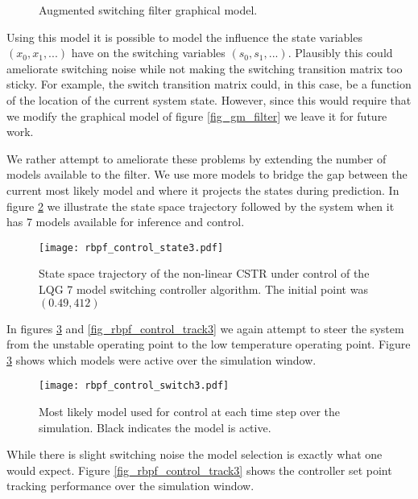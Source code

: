 \begin{enumerate}
\begin{figure}[H]
\caption{Augmented switching filter graphical model.}
\label{fig_gm_augmented}
\end{figure}
Using this model it is possible to model the influence the state variables $(x_0,x_1,...)$ have on the switching variables $(s_0, s_1,...)$. Plausibly this could ameliorate switching noise while not making the switching transition matrix too sticky. For example, the switch transition matrix could, in this case, be a function of the location of the current system state. However, since this would require that we modify the graphical model of figure \ref{fig_gm_filter} we leave it for future work.
\end{enumerate}
We rather attempt to ameliorate these problems by extending the number of models available to the filter. We use more models to bridge the gap between the current most likely model and where it projects the states during prediction. In figure \ref{fig_rbpf_control_state3} we illustrate the state space trajectory followed by the system when it has 7 models available for inference and control.
\begin{figure}[H] 
\centering
\texttt{[image: rbpf\_control\_state3.pdf]}
\caption{State space trajectory of the non-linear CSTR under control of the LQG 7 model switching controller algorithm. The initial point was $(0.49, 412)$}
\label{fig_rbpf_control_state3}
\end{figure}
In figures \ref{fig_rbpf_control_switch3} and \ref{fig_rbpf_control_track3} we again attempt to steer the system from the unstable operating point to the low temperature operating point. Figure \ref{fig_rbpf_control_switch3} shows which models were active over the simulation window.
\begin{figure}[H] 
\centering
\texttt{[image: rbpf\_control\_switch3.pdf]}
\caption{Most likely model used for control at each time step over the simulation. Black indicates the model is active.}
\label{fig_rbpf_control_switch3}
\end{figure}
While there is slight switching noise the model selection is exactly what one would expect. Figure \ref{fig_rbpf_control_track3} shows the controller set point tracking performance over the simulation window.
